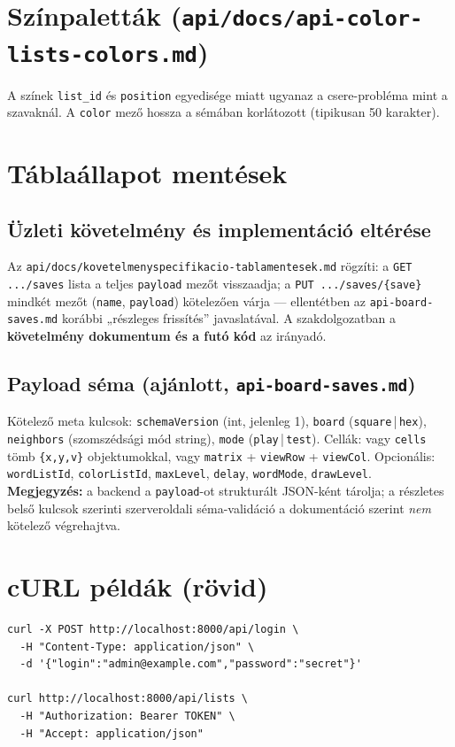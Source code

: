 \section{Színpaletták (\texttt{api/docs/api-color-lists-colors.md})}
A színek \texttt{list\_id} és \texttt{position} egyedisége miatt ugyanaz a csere-probléma mint a szavaknál. A \texttt{color} mező hossza a sémában korlátozott (tipikusan 50 karakter).

\section{Táblaállapot mentések}
\subsection{Üzleti követelmény és implementáció eltérése}
Az \texttt{api/docs/kovetelmenyspecifikacio-tablamentesek.md} rögzíti: a \texttt{GET .../saves} lista a teljes \texttt{payload} mezőt visszaadja; a \texttt{PUT .../saves/\{save\}} mindkét mezőt (\texttt{name}, \texttt{payload}) kötelezően várja — ellentétben az \texttt{api-board-saves.md} korábbi „részleges frissítés” javaslatával. A szakdolgozatban a \textbf{követelmény dokumentum és a futó kód} az irányadó.

\subsection{Payload séma (ajánlott, \texttt{api-board-saves.md})}
Kötelező meta kulcsok: \texttt{schemaVersion} (int, jelenleg 1), \texttt{board} (\texttt{square}\,|\,\texttt{hex}), \texttt{neighbors} (szomszédsági mód string), \texttt{mode} (\texttt{play}\,|\,\texttt{test}). Cellák: vagy \texttt{cells} tömb \texttt{\{x,y,v\}} objektumokkal, vagy \texttt{matrix} + \texttt{viewRow} + \texttt{viewCol}. Opcionális: \texttt{wordListId}, \texttt{colorListId}, \texttt{maxLevel}, \texttt{delay}, \texttt{wordMode}, \texttt{drawLevel}.\\
\textbf{Megjegyzés:} a backend a \texttt{payload}-ot strukturált JSON-ként tárolja; a részletes belső kulcsok szerinti szerveroldali séma-validáció a dokumentáció szerint \emph{nem} kötelező végrehajtva.

\section{cURL példák (rövid)}
\begin{lstlisting}
curl -X POST http://localhost:8000/api/login \
  -H "Content-Type: application/json" \
  -d '{"login":"admin@example.com","password":"secret"}'

curl http://localhost:8000/api/lists \
  -H "Authorization: Bearer TOKEN" \
  -H "Accept: application/json"
\end{lstlisting}
